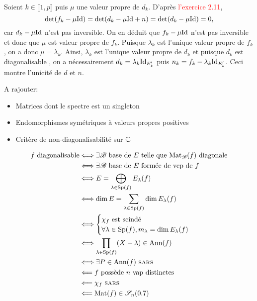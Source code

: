 \begin{solution}
    Soient $k \in \llbracket 1, p \rrbracket$ puis $\mu$ une valeur propre de $d_k$. D'après \textcolor{red}{l'exercice 2.11}, 
    $$\det(f_k - \mu \mathrm{Id}) = \det(d_k - \mu \mathrm{Id} + n) = \det(d_k - \mu \mathrm{Id}) = 0,$$
    car $d_k - \mu \mathrm{Id}$ n'est pas inversible. On en déduit que $f_k - \mu \mathrm{Id}$ n'est pas inversible et donc que $\mu$ est valeur propre de $f_k$. Puisque $\lambda_k$ est l'unique valeur propre de $f_k$, on a donc $\mu = \lambda_k$. Ainsi, $\lambda_k$ est l'unique valeur propre de $d_k$ et puisque $d_k$ est diagonalisable \note {}, on a nécessairement $d_k = \lambda_k \mathrm{Id}_{E'_k}$ puis $n_k = f_k - \lambda_k \mathrm{Id}_{E'_k}$. Ceci montre l'unicité de $d$ et $n$.
\end{solution}

A rajouter:
\begin{itemize}
    \item Matrices dont le spectre est un singleton
    \item Endomorphismes symétriques à valeurs propres positives
    \item Critère de non-diagonalisabilité sur $\mathbb{C}$
\end{itemize}

\newpage

\begin{figure*}
    \begin{Large}
    \begin{align*}
        f \text{ diagonalisable} &\Longleftrightarrow \exists \mathscr{B} \text{ base de } E \text{ telle que } \mathrm{Mat}_\mathscr{B}(f) \text{ diagonale} \\
        &\Longleftrightarrow \exists \mathscr{B} \text{ base de } E \text{ formée de vep de } f\\
        &\Longleftrightarrow E = \bigoplus_{\lambda \in \mathrm{Sp}(f)} E_\lambda(f) \\
        &\Longleftrightarrow \dim E = \sum_{\lambda \in \mathrm{Sp}(f)} \dim E_\lambda(f) \\
        &\Longleftrightarrow 
        \begin{cases}
        \chi_f \text{ est scindé} \\
        \forall \lambda \in \mathrm{Sp}(f), m_{\lambda} = \dim E_\lambda(f)
        \end{cases} \\
        &\Longleftrightarrow \prod_{\lambda \in \mathrm{Sp}(f)}(X-\lambda) \in \mathrm{Ann}(f)\\
        &\Longleftrightarrow \exists P \in \mathrm{Ann}(f) \text{ \textsc{sars}} \\
        &\Longleftarrow f \text{ possède } n \text{ vap distinctes} \\
        &\Longleftarrow \chi_f \text{ \textsc{sars}}\\
        &\Longleftarrow \mathrm{Mat}(f) \in \mathscr{S}_n(0.7)
    \end{align*}
    \end{Large}
\end{figure*}

\begin{figure*}[h!]
    
\end{figure*}